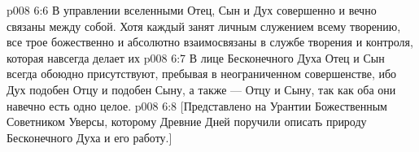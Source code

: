 \vs p008 6:6 \pc В управлении вселенными Отец, Сын и Дух совершенно и вечно связаны между собой. Хотя каждый занят личным служением всему творению, все трое божественно и абсолютно взаимосвязаны в службе творения и контроля, которая навсегда делает их 
\vs p008 6:7 В лице Бесконечного Духа Отец и Сын всегда обоюдно присутствуют, пребывая в неограниченном совершенстве, ибо Дух подобен Отцу и подобен Сыну, а также --- Отцу и Сыну, так как оба они навечно есть одно целое.
\vsetoff
\vs p008 6:8 [Представлено на Урантии Божественным Советником Уверсы, которому Древние Дней поручили описать природу Бесконечного Духа и его работу.]

